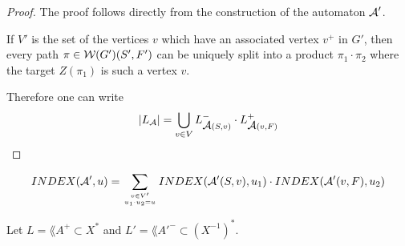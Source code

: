 \begin{proof}
The proof follows directly from the construction of the automaton $\mbox{$\mathcal{A}$}'$.

If $V'$ is the set of the vertices $v$ which have an associated vertex $v^+$ in
$G'$, then every path $\pi \in \mbox{$\mathcal{W}(G')$}(S', F')$ can be uniquely split into
a product $\pi_1 \cdot \pi_2$ where the target $Z(\pi_1)$ is such a vertex $v$.

Therefore one can write
\[ |\mbox{$L_{\mathcal{A}}$}| = \bigcup_{v \in V} L_{\mbox{$\mathcal{A}$}(S, v)}^- \cdot L_{\mbox{$\mathcal{A}$}(v, F)}^+
\]
\end{proof}

\begin{corollary}
\[ INDEX(\mbox{$\mathcal{A}$}', u) = \sum_{v \in V' \atop u_1 \cdot u_2 = u}
INDEX(\mbox{$\mathcal{A}$}'(S, v), u_1) \cdot INDEX(\mbox{$\mathcal{A}$}'(v, F), u_2) \]
\end{corollary}

\begin{lemma}
Let $L = \lang{A}^+ \subset X^*$ and $L' = \lang{A'}^- \subset (X^{-1})^*$.
\end{lemma}


















